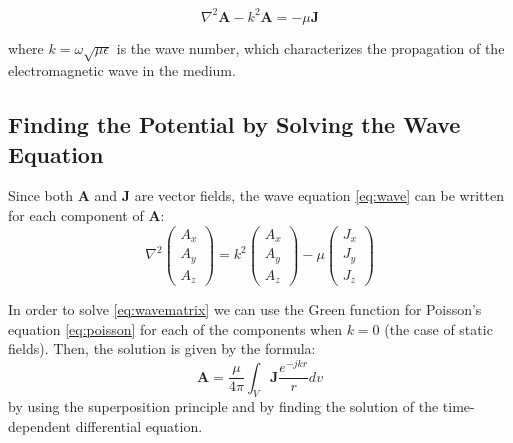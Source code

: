 \begin{equation}
    \nabla^2 \mathbf{A} - k^2 \mathbf{A} = -\mu \mathbf{J}
    \label{eq:wave}
\end{equation}

where \(k = \omega \sqrt{\mu \epsilon}\) is the wave number, which characterizes the propagation of the electromagnetic wave in the medium.


\subsection{Finding the Potential by Solving the Wave Equation}
Since both \(\mathbf{A}\) and \(\mathbf{J}\) are vector fields, the wave equation \ref{eq:wave} can be written for each component of \(\mathbf{A}\):
\begin{equation}
    \nabla^2 \begin{pmatrix} A_x \\ A_y \\ A_z \end{pmatrix} = k^2 \begin{pmatrix} A_x \\ A_y \\ A_z \end{pmatrix} - \mu \begin{pmatrix} J_x \\ J_y \\ J_z \end{pmatrix}
    \label{eq:wavematrix}
\end{equation}

In order to solve \ref{eq:wavematrix} we can use the Green function for Poisson's equation \ref{eq:poisson} for each of the components when $k =  0 $ (the case of static fields).
Then, the solution is given by the formula:
\begin{equation}
\mathbf{A} = \frac{\mu}{4 \pi} \int_V \mathbf{J} \frac{e^{-jkr}}{r} dv
    \label{eq:solA}
\end{equation}
by using the superposition principle and by finding the solution of the time-dependent differential equation.

